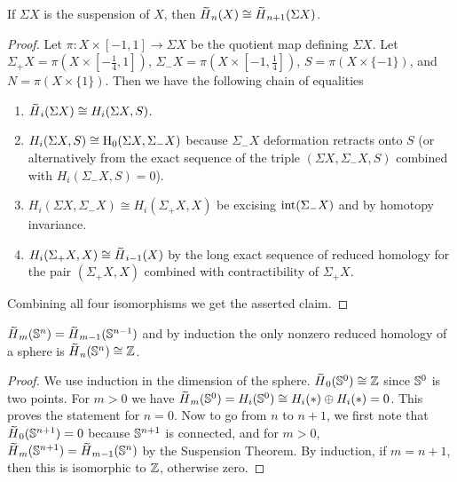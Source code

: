 \begin{cor}
    If $\Sigma X$ is the suspension of $X$, then $\wt{H}_n(X)\cong \wt{H}_{n+1}(\Sigma X)$.
\end{cor}
\begin{proof}
    Let $\pi:X\times [-1,1]\to \Sigma X$ be the quotient map defining $\Sigma X$. Let $\Sigma_+ X=\pi(X\times [-\frac 14,1])$, $\Sigma_-X=\pi(X\times [-1,\frac14])$, $S=\pi(X\times \{-1\})$, and $N=\pi(X\times\{1\})$. Then we have the following chain of equalities
    \begin{enumerate}
        \item $\wt{H}_i(\Sigma X)\cong H_i(\Sigma X,S)$.
        \item $H_i(\Sigma X,S)\cong \mathrm{H}_0(\Sigma X,\Sigma_-X)$ because $\Sigma_-X$ deformation retracts onto $S$ (or alternatively from the exact sequence of the triple $(\Sigma X,\Sigma_- X,S)$ combined with $H_i(\Sigma_-X,S)=0$).
        \item $H_i(\Sigma X,\Sigma_-X)\cong H_i(\Sigma_+X,X)$ be excising $\operatorname{int}(\Sigma_-X)$ and by homotopy invariance.
        \item $H_i(\Sigma_+X,X)\cong \wt{H}_{i-1}(X)$ by the long exact sequence of reduced homology for the pair $(\Sigma_+X,X)$ combined with contractibility of $\Sigma_+X$.
    \end{enumerate}
    Combining all four isomorphisms we get the asserted claim.
\end{proof}



\begin{cor}\label{reduced homology of spheres}
    $\wt{H}_m(\bbS^n)=\wt{H}_{m-1}(\bbS^{n-1})$ and by induction the only nonzero reduced homology of a sphere is $\wt{H}_n(\bbS^n)\cong \bbZ$.
\end{cor}
\begin{proof}
     We use induction in the dimension of the sphere. $\wt{H}_0(\bbS^0)\cong\bbZ$ since $\mathbb{S}^0$ is two points. For $m>0$ we have $\wt{H}_m(\bbS^0)=H_i(\bbS^0)\cong H_i(\ast)\oplus H_i(\ast)=0$. This proves the statement for $n=0$. Now to go from $n$ to $n+1$, we first note that $\wt{H}_0(\bbS^{n+1})=0$ because $\mathbb{S}^{n+1}$ is connected, and for $m>0$, $\wt{H}_{m}(\bbS^{n+1})=\wt{H}_{m-1}(\bbS^n)$ by the Suspension Theorem. By induction, if $m=n+1$, then this is isomorphic to $\mathbb{Z}$, otherwise zero.
\end{proof}

